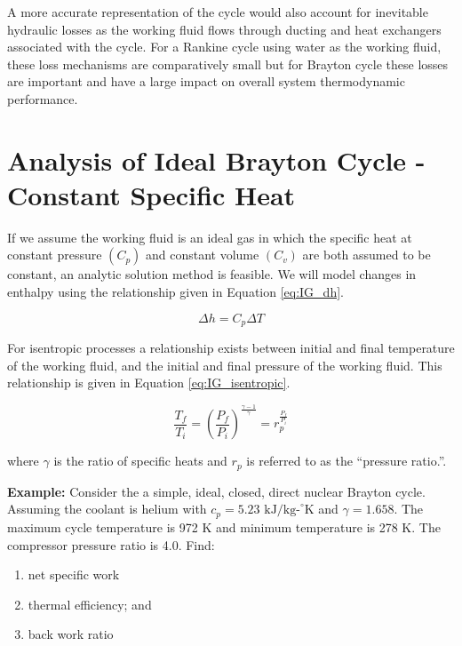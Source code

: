 A more accurate representation of the cycle would also account for inevitable hydraulic losses as the working fluid flows through ducting and heat exchangers associated with the cycle.  For a Rankine cycle using water as the working fluid, these loss mechanisms are comparatively small but for Brayton cycle these losses are important and have a large impact on overall system thermodynamic performance.

\section{Analysis of Ideal Brayton Cycle - Constant Specific Heat}

If we assume the working fluid is an ideal gas in which the specific heat at constant pressure $(C_p)$ and constant volume $(C_v)$ are both assumed to be constant, an analytic solution method is feasible. We will model changes in enthalpy using the relationship given in Equation \ref{eq:IG_dh}.

\begin{equation}
\Delta h = C_p \Delta T
\label{eq:IG_dh}
\end{equation}

For isentropic processes a relationship exists between initial and final temperature of the working fluid, and the initial and final pressure of the working fluid. This relationship is given in Equation \ref{eq:IG_isentropic}.


\begin{equation}
\frac{T_f}{T_i} = \left(\frac{P_f}{P_i} \right)^{\frac{\gamma - 1}{\gamma}} = r_p^{\frac{P_f}{P_i}}
\label{eq:IG_isentropic}
\end{equation}


where $\gamma$ is the ratio of specific heats and $r_p$ is referred to as the ``pressure ratio.''.  


\begin{example}
\textbf{Example:} Consider the a simple, ideal, closed, direct nuclear Brayton cycle.  Assuming the coolant is helium with $c_p=5.23 \text{ kJ/kg-}^{\circ}\text{K}$ and $\gamma=1.658$.  The maximum cycle temperature is 972 K and minimum temperature is 278 K.  The compressor pressure ratio is 4.0.  Find:
\begin{enumerate}
\item net specific work
\item thermal efficiency; and
\item back work ratio
\end{enumerate}
\end{example}

